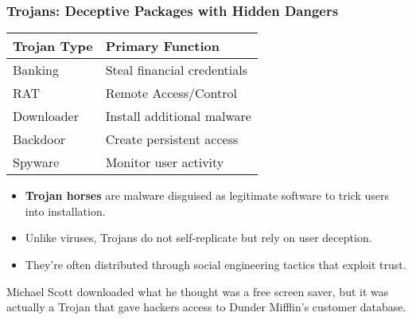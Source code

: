 \documentclass{beamer}
\begin{document}
\begin{frame}
    \frametitle{Trojans: Deceptive Packages with Hidden Dangers}
    
    \begin{table}
        \centering
        \begin{tabular}{l|l}
            \textbf{Trojan Type} & \textbf{Primary Function} \\
            \hline
            Banking & Steal financial credentials \\
            RAT & Remote Access/Control \\
            Downloader & Install additional malware \\
            Backdoor & Create persistent access \\
            Spyware & Monitor user activity \\
        \end{tabular}
    \end{table}
    
    \begin{itemize}
        \item \textbf{Trojan horses} are malware disguised as legitimate software to trick users into installation.
        \item Unlike viruses, Trojans do not self-replicate but rely on user deception.
        \item They're often distributed through social engineering tactics that exploit trust.
    \end{itemize}
    
    \begin{example}
        Michael Scott downloaded what he thought was a free screen saver, but it was actually a Trojan that gave hackers access to Dunder Mifflin's customer database.
    \end{example}
\end{frame}
\end{document}
